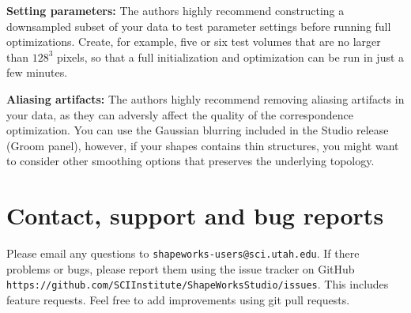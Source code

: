 \documentclass[letterpaper,12pt]{article}   %
\begin{document}
\vspace{0.1in}
\noindent\textbf{Setting parameters:} The authors highly recommend constructing a downsampled subset of your data to test parameter settings before running full optimizations. Create, for example, five or six test volumes that are no larger than $128^3$ pixels, so that a full initialization and optimization can be run in just a few minutes. 

\vspace{0.1in}
\noindent\textbf{Aliasing artifacts:} The authors highly recommend removing aliasing artifacts in your data, as they can adversly affect the quality of the correspondence optimization. You can use the Gaussian blurring included in the Studio release (Groom panel), however, if your shapes contains thin structures, you might want to consider other smoothing options that preserves the underlying topology.


\section{Contact, support and bug reports}

Please email any questions to \texttt{shapeworks-users@sci.utah.edu}. If there problems or bugs, please report them using the issue tracker on GitHub \texttt{https://github.com/SCIInstitute/ShapeWorksStudio/issues}. This includes feature requests. Feel free to add improvements using git pull requests. 

 

\end{document}
